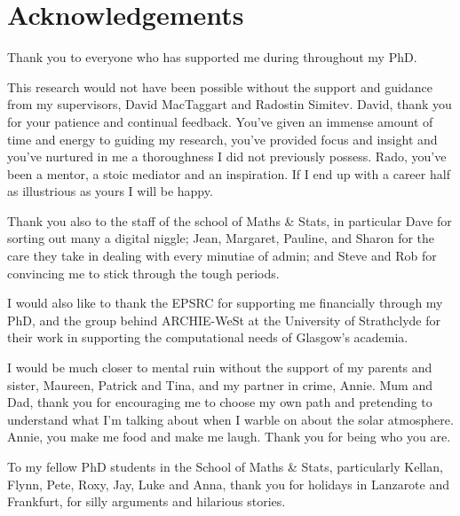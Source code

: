 \chapter{Acknowledgements}

Thank you to everyone who has supported me during throughout my PhD. 

\vspace{5mm}

This research would not have been possible without the support and guidance from my supervisors, David MacTaggart and Radostin Simitev. David, thank you for your patience and continual feedback. You've given an immense amount of time and energy to guiding my research, you've provided focus and insight and you've nurtured in me a thoroughness I did not previously possess. Rado, you've been a mentor, a stoic mediator and an inspiration. If I end up with a career half as illustrious as yours I will be happy.

Thank you also to the staff of the school of Maths \& Stats, in particular Dave for sorting out many a digital niggle; Jean, Margaret, Pauline, and Sharon for the care they take in dealing with every minutiae of admin; and Steve and Rob for convincing me to stick through the tough periods.

I would also like to thank the EPSRC for supporting me financially through my PhD, and the group behind ARCHIE-WeSt at the University of Strathclyde for their work in supporting the computational needs of Glasgow's academia.

\vspace{5mm}

I would be much closer to mental ruin without the support of my parents and sister, Maureen, Patrick and Tina, and my partner in crime, Annie. Mum and Dad, thank you for encouraging me to choose my own path and pretending to understand what I'm talking about when I warble on about the solar atmosphere. Annie, you make me food and make me laugh. Thank you for being who you are.

\vspace{5mm}

To my fellow PhD students in the School of Maths \& Stats, particularly Kellan, Flynn, Pete, Roxy, Jay, Luke and Anna, thank you for holidays in Lanzarote and Frankfurt, for silly arguments and hilarious stories.
